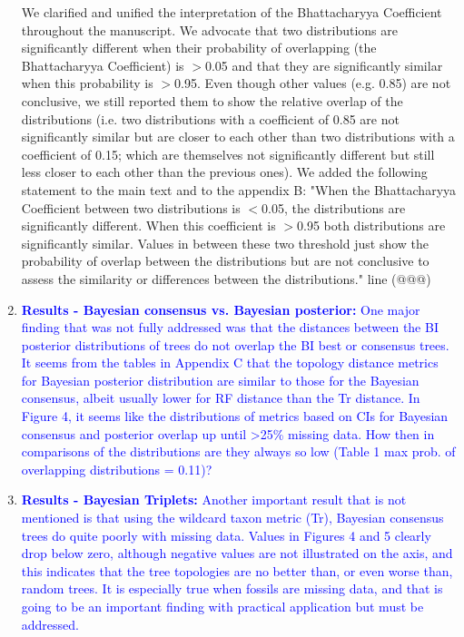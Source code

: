 \documentclass[12pt,letterpaper]{article}
\begin{document}
\begin{enumerate}
We clarified and unified %
the interpretation of the Bhattacharyya Coefficient throughout the manuscript.
We advocate that two distributions are significantly different when their probability of overlapping (the Bhattacharyya Coefficient) is $>$0.05 and that they are significantly similar when this probability is $>$0.95.
Even though other values (e.g. 0.85) are not conclusive, we still reported them to show the relative overlap of the distributions (i.e. two distributions with a coefficient of 0.85 are not significantly similar but are closer to each other than two distributions with a coefficient of 0.15; which are themselves not significantly different but still less closer to each other than the previous ones).
We added the following statement to the main text and to the appendix B:
"When the Bhattacharyya Coefficient between two distributions is $<$0.05, the distributions are significantly different.
When this coefficient is $>$0.95 both distributions are significantly similar.
Values in between these two threshold just show the probability of overlap between the distributions but are not conclusive to assess the similarity or differences between the distributions." line (@@@)

\item{\textcolor{blue}{\textbf{Results - Bayesian consensus vs. Bayesian posterior:} One major finding that was not fully addressed was that the distances between the BI posterior distributions of trees do not overlap the BI best or consensus trees.
It seems from the tables in Appendix C that the topology distance metrics for Bayesian posterior distribution are similar to those for the Bayesian consensus, albeit usually lower for RF distance than the Tr distance.
In Figure 4, it seems like the distributions of metrics based on CIs for Bayesian consensus and posterior overlap up until >25\% missing data.
How then in comparisons of the distributions are they always so low (Table 1 max prob. of overlapping distributions = 0.11)?}}

\item{\textcolor{blue}{\textbf{Results - Bayesian Triplets:} Another important result that is not mentioned is that using the wildcard taxon metric (Tr), Bayesian consensus trees do quite poorly with missing data.
Values in Figures 4 and 5 clearly drop below zero, although negative values are not illustrated on the axis, and this indicates that the tree topologies are no better than, or even worse than, random trees.
It is especially true when fossils are missing data, and that is going to be an important finding with practical application but must be addressed. }}


\end{enumerate}
\end{document}
